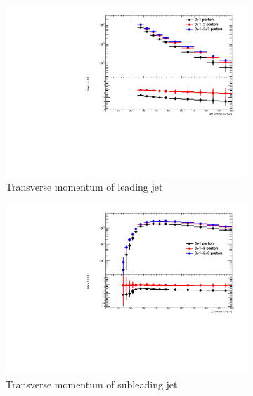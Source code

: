 \begin{figure} [thbp]
  \center
  \begin{subfigure}{0.48\linewidth}
    \includegraphics[width=\linewidth]{figures/monojet_appendix/h_MET_MET250.pdf}
    \caption{Transverse momentum of leading jet}
  \end{subfigure}
  \begin{subfigure}{0.48\linewidth}
    \includegraphics[width=\linewidth]{figures/monojet_appendix/h_pt1_MET250.pdf}
    \caption{Transverse momentum of subleading jet}
  \end{subfigure}
  \begin{subfigure}{0.48\linewidth}

\end{subfigure}
\end{figure}
